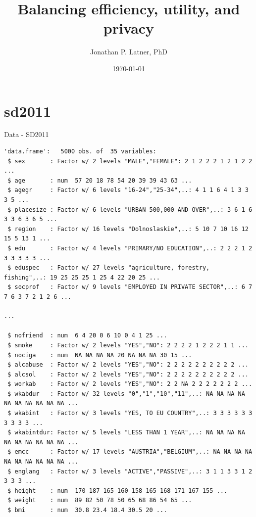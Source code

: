 \documentclass[xcolor=table]{beamer}
\author{Jonathan P. Latner, PhD}
\title{Balancing efficiency, utility, and privacy}
\date{\today}
\begin{document}
\section{sd2011}
\begin{frame}[fragile]{Data - SD2011}

\begin{lstlisting}[firstnumber=1, label=glabels, xleftmargin=10pt,frame=single] 
'data.frame':   5000 obs. of  35 variables:
 $ sex       : Factor w/ 2 levels "MALE","FEMALE": 2 1 2 2 2 1 2 1 2 2 ...
 $ age       : num  57 20 18 78 54 20 39 39 43 63 ...
 $ agegr     : Factor w/ 6 levels "16-24","25-34",..: 4 1 1 6 4 1 3 3 3 5 ...
 $ placesize : Factor w/ 6 levels "URBAN 500,000 AND OVER",..: 3 6 1 6 3 3 6 3 6 5 ...
 $ region    : Factor w/ 16 levels "Dolnoslaskie",..: 5 10 7 10 16 12 15 5 13 1 ...
 $ edu       : Factor w/ 4 levels "PRIMARY/NO EDUCATION",..: 2 2 2 1 2 3 3 3 3 3 ...
 $ eduspec   : Factor w/ 27 levels "agriculture, forestry, fishing",..: 19 25 25 25 1 25 4 22 20 25 ...
 $ socprof   : Factor w/ 9 levels "EMPLOYED IN PRIVATE SECTOR",..: 6 7 7 6 3 7 2 1 2 6 ...

...

 $ nofriend  : num  6 4 20 0 6 10 0 4 1 25 ...
 $ smoke     : Factor w/ 2 levels "YES","NO": 2 2 2 2 1 2 2 2 1 1 ...
 $ nociga    : num  NA NA NA NA 20 NA NA NA 30 15 ...
 $ alcabuse  : Factor w/ 2 levels "YES","NO": 2 2 2 2 2 2 2 2 2 2 ...
 $ alcsol    : Factor w/ 2 levels "YES","NO": 2 2 2 2 2 2 2 2 2 2 ...
 $ workab    : Factor w/ 2 levels "YES","NO": 2 2 NA 2 2 2 2 2 2 2 ...
 $ wkabdur   : Factor w/ 32 levels "0","1","10","11",..: NA NA NA NA NA NA NA NA NA NA ...
 $ wkabint   : Factor w/ 3 levels "YES, TO EU COUNTRY",..: 3 3 3 3 3 3 3 3 3 3 ...
 $ wkabintdur: Factor w/ 5 levels "LESS THAN 1 YEAR",..: NA NA NA NA NA NA NA NA NA NA ...
 $ emcc      : Factor w/ 17 levels "AUSTRIA","BELGIUM",..: NA NA NA NA NA NA NA NA NA NA ...
 $ englang   : Factor w/ 3 levels "ACTIVE","PASSIVE",..: 3 1 1 3 3 1 2 3 3 3 ...
 $ height    : num  170 187 165 160 158 165 168 171 167 155 ...
 $ weight    : num  89 82 50 78 50 65 68 86 54 65 ...
 $ bmi       : num  30.8 23.4 18.4 30.5 20 ...
\end{lstlisting}

\end{frame}

\end{document}
